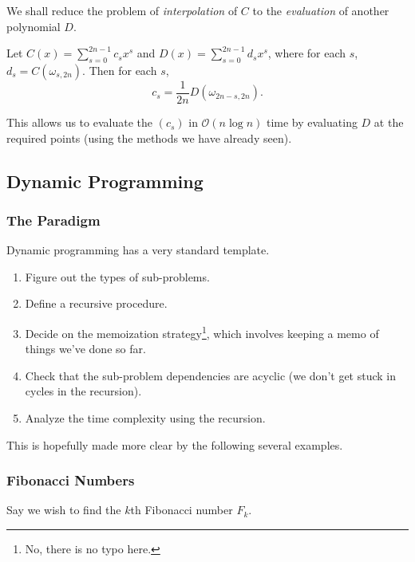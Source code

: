 We shall reduce the problem of \textit{interpolation} of $C$ to the \textit{evaluation} of another polynomial $D$.

\begin{lemma*}
	Let $C(x)=\sum_{s=0}^{2n-1} c_s x^s$ and $D(x)=\sum_{s=0}^{2n-1} d_s x^s$, where for each $s$, $d_s = C(\omega_{s,2n})$. Then for each $s$,
	\[ c_s = \frac{1}{2n} D(\omega_{2n-s,2n}). \]
\end{lemma*}


This allows us to evaluate the $(c_s)$ in $\mathcal{O}(n\log n)$ time by evaluating $D$ at the required points (using the methods we have already seen).

\subsection{Dynamic Programming}

\subsubsection{The Paradigm}

Dynamic programming has a very standard template.

\begin{enumerate}
	\item Figure out the types of sub-problems.
	\item Define a recursive procedure.
	\item Decide on the memoization strategy\footnote{No, there is no typo here.}, which involves keeping a memo of things we've done so far.
	\item Check that the sub-problem dependencies are acyclic (we don't get stuck in cycles in the recursion).
	\item Analyze the time complexity using the recursion.
\end{enumerate}

This is hopefully made more clear by the following several examples.

\subsubsection{Fibonacci Numbers}

Say we wish to find the $k$th Fibonacci number $F_k$.\\

